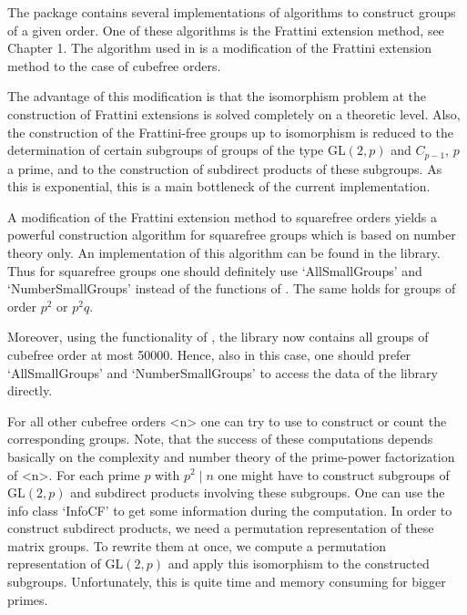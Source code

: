 
The package {\GrpConst} contains several implementations of algorithms to
construct groups of a given order. One of these algorithms is the Frattini
extension method, see Chapter 1. The algorithm used in
{\Cubefree} is a modification of the Frattini extension method to the case of
cubefree orders. 

The advantage of this modification is that the isomorphism
problem at the construction of Frattini extensions is solved completely on a
theoretic level. Also, the construction of the Frattini-free groups up to
isomorphism is reduced to the determination of certain subgroups of groups of
the type GL$(2,p)$ and $C_{p-1}$, $p$ a prime, and to the construction of subdirect products
of these subgroups. As this is exponential, this is a main bottleneck of the current implementation.

A modification of the Frattini extension method to squarefree orders yields a
powerful 
construction algorithm for squarefree groups which is based on number theory
only. An implementation of this algorithm can be found
in the {\SmallGroups} library. Thus for squarefree
groups one should definitely use `AllSmallGroups' and `NumberSmallGroups'
instead of the functions of {\Cubefree}. The same holds for groups of order
$p^2$ or $p^2q$.

Moreover, using the functionality of {\Cubefree}, the {\SmallGroups} library now
contains all groups of cubefree order at most 50000. Hence, also in this case,
one should prefer `AllSmallGroups' and `NumberSmallGroups' to access the data
of the library directly.

For all other cubefree  orders <n> one can try to use
{\Cubefree} to construct or count the corresponding groups. Note, that the
success of these computations depends basically on the complexity and number
theory of the
prime-power factorization of <n>. For each prime $p$ with $p^2\mid n$ one
might have to construct subgroups of GL$(2,p)$ and subdirect products
involving these subgroups. One can use the info class `InfoCF' to get some
information during the computation. 
In order to construct subdirect products, we need a permutation representation of these
matrix groups. To rewrite them at once, we compute a
permutation representation of GL$(2,p)$ and apply this isomorphism to the
constructed subgroups. Unfortunately, this is quite time and memory consuming
for bigger primes.

